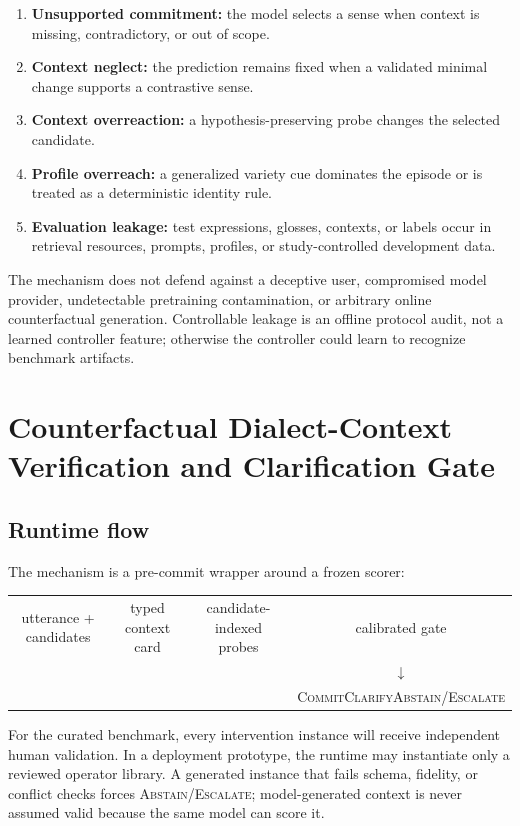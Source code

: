 \documentclass[preprint,12pt,authoryear]{elsarticle}
\newcommand{\commit}{\ifmmode\operatorname{COMMIT}\else\textsc{Commit}\fi}
\newcommand{\clarify}{\ifmmode\operatorname{CLARIFY}\else\textsc{Clarify}\fi}
\newcommand{\abstain}{\ifmmode\operatorname{ABSTAIN}\else\textsc{Abstain/Escalate}\fi}
\begin{document}
\begin{enumerate}[leftmargin=*]
\item \textbf{Unsupported commitment:} the model selects a sense when context
is missing, contradictory, or out of scope.
\item \textbf{Context neglect:} the prediction remains fixed when a validated
minimal change supports a contrastive sense.
\item \textbf{Context overreaction:} a hypothesis-preserving probe changes the
selected candidate.
\item \textbf{Profile overreach:} a generalized variety cue dominates the
episode or is treated as a deterministic identity rule.
\item \textbf{Evaluation leakage:} test expressions, glosses, contexts, or
labels occur in retrieval resources, prompts, profiles, or study-controlled
development data.
\end{enumerate}

The mechanism does not defend against a deceptive user, compromised model
provider, undetectable pretraining contamination, or arbitrary online
counterfactual generation. Controllable leakage is an offline protocol audit,
not a learned controller feature; otherwise the controller could learn to
recognize benchmark artifacts.

\section{Counterfactual Dialect-Context Verification and Clarification Gate}

\subsection{Runtime flow}

The mechanism is a pre-commit wrapper around a frozen scorer:

\begin{center}
\small
\begin{tabular}{c@{ $\rightarrow$ }c@{ $\rightarrow$ }c@{ $\rightarrow$ }c}
utterance + candidates & typed context card & candidate-indexed probes & calibrated gate\\
&&& $\downarrow$\\[-0.2em]
&&& \commit\quad\clarify\quad\abstain
\end{tabular}
\end{center}

For the curated benchmark, every intervention instance will receive
independent human validation. In a deployment prototype, the runtime may instantiate only a
reviewed operator library. A generated instance that fails schema, fidelity,
or conflict checks forces \abstain; model-generated context is never assumed
valid because the same model can score it.
\end{document}
